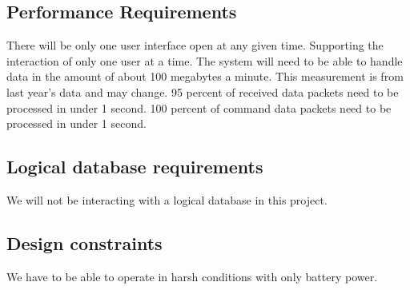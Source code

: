 \documentclass[10pt,draftclsnofoot,onecolumn,compsoc]{IEEEtran}
\begin{document}
\subsection{ Performance Requirements}
There will be only one user interface open at any given time. Supporting the interaction of only one user at a time. The system will need to be able to handle data in the amount of about 100 megabytes a minute. This measurement is from last year's data and may change. 95 percent of received data packets need to be processed in under 1 second. 100 percent of command data packets need to be processed in under 1 second.

\subsection{Logical database requirements}
We will not be interacting with a logical database in this project.

\subsection{Design constraints}
We have to be able to operate in harsh conditions with only battery power.
\end{document}
